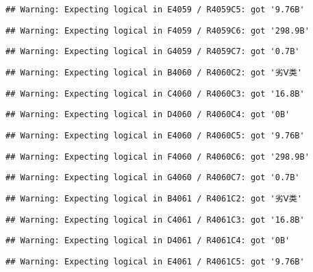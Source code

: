 \documentclass[
]{article}
\begin{document}
\begin{verbatim}
## Warning: Expecting logical in E4059 / R4059C5: got '9.76B'
\end{verbatim}

\begin{verbatim}
## Warning: Expecting logical in F4059 / R4059C6: got '298.9B'
\end{verbatim}

\begin{verbatim}
## Warning: Expecting logical in G4059 / R4059C7: got '0.7B'
\end{verbatim}

\begin{verbatim}
## Warning: Expecting logical in B4060 / R4060C2: got '劣Ⅴ类'
\end{verbatim}

\begin{verbatim}
## Warning: Expecting logical in C4060 / R4060C3: got '16.8B'
\end{verbatim}

\begin{verbatim}
## Warning: Expecting logical in D4060 / R4060C4: got '0B'
\end{verbatim}

\begin{verbatim}
## Warning: Expecting logical in E4060 / R4060C5: got '9.76B'
\end{verbatim}

\begin{verbatim}
## Warning: Expecting logical in F4060 / R4060C6: got '298.9B'
\end{verbatim}

\begin{verbatim}
## Warning: Expecting logical in G4060 / R4060C7: got '0.7B'
\end{verbatim}

\begin{verbatim}
## Warning: Expecting logical in B4061 / R4061C2: got '劣Ⅴ类'
\end{verbatim}

\begin{verbatim}
## Warning: Expecting logical in C4061 / R4061C3: got '16.8B'
\end{verbatim}

\begin{verbatim}
## Warning: Expecting logical in D4061 / R4061C4: got '0B'
\end{verbatim}

\begin{verbatim}
## Warning: Expecting logical in E4061 / R4061C5: got '9.76B'
\end{verbatim}
\end{document}
